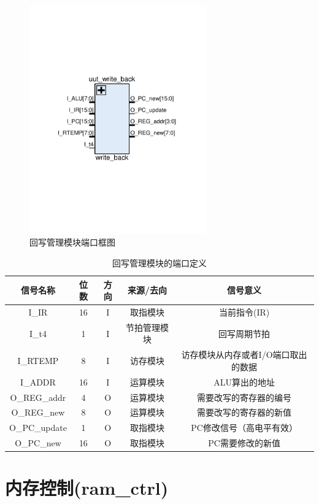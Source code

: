 \documentclass[forprint]{WHUBachelor}
\begin{document}
\begin{figure}[H]
  \centering
  \includegraphics[width=3in]{figures/ports/write_back.pdf}
  \caption{回写管理模块端口框图}
  \label{fig:ports:write_back}
\end{figure}

\begin{table}[H]
  \centering
  \begin{tabular}{c c c c c}
    \hline
    信号名称 & 位数 & 方向 & 来源/去向 & 信号意义 \\
    \hline
    I\_IR & 16 & I & 取指模块 & 当前指令(IR) \\
    I\_t4 & 1 & I & 节拍管理模块 & 回写周期节拍 \\
    I\_RTEMP & 8 & I & 访存模块 & 访存模块从内存或者I/O端口取出的数据 \\
    I\_ADDR & 16 & I & 运算模块 & ALU算出的地址 \\
    O\_REG\_addr & 4 & O & 运算模块 & 需要改写的寄存器的编号 \\
    O\_REG\_new & 8 & O & 运算模块 & 需要改写的寄存器的新值 \\
    O\_PC\_update & 1 & O & 取指模块 & PC修改信号（高电平有效）\\
    O\_PC\_new & 16 & O & 取指模块 & PC需要修改的新值\\
    \hline
  \end{tabular}
  \caption{回写管理模块的端口定义}
  \label{tab:ports:write_back}
\end{table}

\section{内存控制(ram\_ctrl)}
\end{document}
